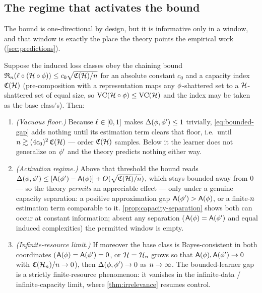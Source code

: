 \subsection{The regime that activates the bound}
\label{subsec:regime}

The bound is one-directional by design, but it is informative only in a window,
and that window is exactly the place the theory points the empirical work
(\cref{sec:predictions}).

\begin{proposition}
\label{prop:regime}
Suppose the induced loss classes obey the chaining bound
$\mathfrak{R}_n(\ell\circ(\mathcal{H}\circ\phi))\le c_0\sqrt{\mathfrak{C}(\mathcal{H})/n}$
for an absolute constant $c_0$ and a capacity index $\mathfrak{C}(\mathcal{H})$
\citep[Ch.~6]{shalevshwartz2014} (pre-composition with a representation maps any
$\phi$-shattered set to a $\mathcal{H}$-shattered set of equal size, so
$\mathrm{VC}(\mathcal{H}\circ\phi)\le\mathrm{VC}(\mathcal{H})$ and the index may be
taken as the base class's). Then:
\begin{enumerate}
  \item[(i)] \emph{(Vacuous floor.)} Because $\ell\in[0,1]$ makes
    $\Delta(\phi,\phi')\le 1$ trivially, \eqref{eq:bounded-gap} adds nothing
    until its estimation term clears that floor, i.e.\ until
    $n \gtrsim (4c_0)^2\,\mathfrak{C}(\mathcal{H})$ --- order $\mathfrak{C}(\mathcal{H})$
    samples. Below it the learner does not generalize on $\phi'$ and the theory
    predicts nothing either way.
  \item[(ii)] \emph{(Activation regime.)} Above that threshold the bound reads
    $\Delta(\phi,\phi')\le[\mathsf{A}(\phi')-\mathsf{A}(\phi)]
      +O(\sqrt{\mathfrak{C}(\mathcal{H})/n})$, which stays bounded away from $0$
    --- so the theory \emph{permits} an appreciable effect --- only under a
    genuine capacity separation: a positive approximation gap
    $\mathsf{A}(\phi')>\mathsf{A}(\phi)$, or a finite-$n$ estimation term
    comparable to it. \cref{prop:capacity-separation} shows both can occur at
    constant information; absent any separation
    ($\mathsf{A}(\phi)=\mathsf{A}(\phi')$ and equal induced complexities) the
    permitted window is empty.
  \item[(iii)] \emph{(Infinite-resource limit.)} If moreover the base class is
    Bayes-consistent in both coordinates ($\mathsf{A}(\phi)=\mathsf{A}(\phi')=0$,
    or $\mathcal{H}=\mathcal{H}_n$ grows so that
    $\mathsf{A}(\phi),\mathsf{A}(\phi')\to 0$ with
    $\mathfrak{C}(\mathcal{H}_n)/n\to 0$), then
    $\Delta(\phi,\phi')\to 0$ as $n\to\infty$. The bounded-learner gap
    is a strictly finite-resource phenomenon: it vanishes in the
    infinite-data / infinite-capacity limit, where \cref{thm:irrelevance}
    resumes control.
\end{enumerate}
\end{proposition}

